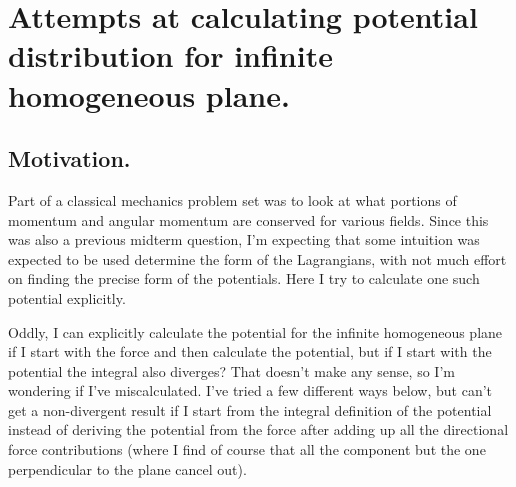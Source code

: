 
%

\chapter{Attempts at calculating potential distribution for infinite homogeneous plane.}
\label{chap:infiniteSheetPotentials}
{}
\date{Feb 19, 2012}

\beginArtWithToc

\section{Motivation.}

Part of a classical mechanics problem set was to look at what portions of momentum and angular momentum are conserved for various fields.  Since this was also a previous midterm question, I'm expecting that some intuition was expected to be used determine the form of the Lagrangians, with not much effort on finding the precise form of the potentials.  Here I try to calculate one such potential explicitly.


Oddly, I can explicitly calculate the potential for the infinite homogeneous plane if I start with the force and then calculate the potential, but if I start with the potential the integral also diverges?  That doesn't make any sense, so I'm wondering if I've miscalculated.  I've tried a few different ways below, but can't get a non-divergent result if I start from the integral definition of the potential instead of deriving the potential from the force after adding up all the directional force contributions (where I find of course that all the component but the one perpendicular to the plane cancel out).
%

